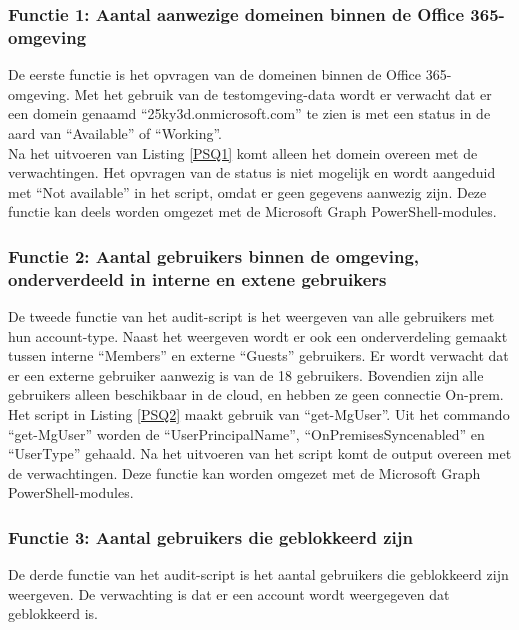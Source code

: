 \subsubsection{Functie 1: Aantal aanwezige domeinen binnen de Office 365-omgeving}

De eerste functie is het opvragen van de domeinen binnen de Office 365-omgeving. Met het gebruik van de testomgeving-data wordt er verwacht dat er een domein genaamd “25ky3d.onmicrosoft.com” te zien is met een status in de aard van “Available” of “Working”. \\

Na het uitvoeren van Listing \ref{PSQ1} komt alleen het domein overeen met de verwachtingen. Het opvragen van de status is niet mogelijk en wordt aangeduid met “Not available” in het script, omdat er geen gegevens aanwezig zijn. Deze functie kan deels worden omgezet met de Microsoft Graph PowerShell-modules.

\subsubsection{Functie 2: Aantal gebruikers binnen de omgeving, onderverdeeld in interne en extene gebruikers}

De tweede functie van het audit-script is het weergeven van alle gebruikers met hun account-type. Naast het weergeven wordt er ook een onderverdeling gemaakt tussen interne “Members” en externe “Guests” gebruikers. Er wordt verwacht dat er een externe gebruiker aanwezig is van de 18 gebruikers. Bovendien zijn alle gebruikers alleen beschikbaar in de cloud, en hebben ze geen connectie \ac{On-prem}. \\

Het script in Listing \ref{PSQ2} maakt gebruik van “get-MgUser”. Uit het commando “get-MgUser” worden de “UserPrincipalName”, “OnPremisesSyncenabled” en “UserType” gehaald.  Na het uitvoeren van het script komt de output overeen met de verwachtingen. Deze functie kan worden omgezet met de Microsoft Graph PowerShell-modules. \\

\subsubsection{Functie 3: Aantal gebruikers die geblokkeerd zijn}

De derde functie van het audit-script is het aantal gebruikers die geblokkeerd zijn weergeven. De verwachting is dat er een account wordt weergegeven dat geblokkeerd is. \\

